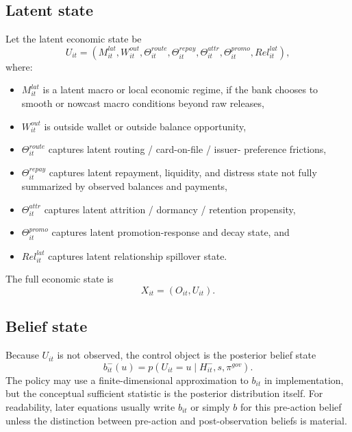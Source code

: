 \documentclass[11pt]{article}
\newcommand{\1}{\mathbf{1}}
\theoremstyle{definition}
\begin{document}
\subsection{Latent state}

Let the latent economic state be
\begin{equation}
  U_{it}
  =
  (M^{lat}_{it},W^{out}_{it},\Theta^{route}_{it},\Theta^{repay}_{it},
   \Theta^{attr}_{it},\Theta^{promo}_{it},Rel^{lat}_{it}),
  \label{eq:latent-state}
\end{equation}
where:
\begin{itemize}[leftmargin=*]
  \item $M^{lat}_{it}$ is a latent macro or local economic regime, if the bank
        chooses to smooth or nowcast macro conditions beyond raw releases,
  \item $W^{out}_{it}$ is outside wallet or outside balance opportunity,
  \item $\Theta^{route}_{it}$ captures latent routing / card-on-file / issuer-
        preference frictions,
  \item $\Theta^{repay}_{it}$ captures latent repayment, liquidity, and
        distress state not fully summarized by observed balances and payments,
  \item $\Theta^{attr}_{it}$ captures latent attrition / dormancy / retention
        propensity,
  \item $\Theta^{promo}_{it}$ captures latent promotion-response and decay
        state, and
  \item $Rel^{lat}_{it}$ captures latent relationship spillover state.
\end{itemize}

The full economic state is
\begin{equation}
  X_{it} = (O_{it},U_{it}).
  \label{eq:full-state}
\end{equation}

\subsection{Belief state}

Because $U_{it}$ is not observed, the control object is the posterior
belief state
\begin{equation}
  b^{-}_{it}(u)
  =
  p(U_{it}=u\mid H_{it}^{-},s,\pi^{gov}).
  \label{eq:belief-state}
\end{equation}
The policy may use a finite-dimensional approximation to $b_{it}$ in
implementation, but the conceptual sufficient statistic is the posterior
distribution itself.
For readability, later equations usually write $b_{it}$ or simply $b$ for this
pre-action belief unless the distinction between pre-action and post-observation
beliefs is material.
\end{document}
